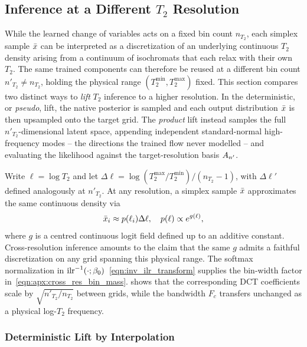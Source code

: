 \subsection{Inference at a Different \texorpdfstring{$T_2$}{T2} Resolution}\label{sec:apx:cross_resolution}

While the learned change of variables acts on a fixed bin count $n_{T_2}$, each simplex sample $\bar{x}$ can be interpreted as a discretization of an underlying continuous $T_2$ density arising from a continuum of isochromats that each relax with their own $T_2$.
The same trained components can therefore be reused at a different bin count $n'_{T_2} \neq n_{T_2}$, holding the physical range $(T_2^{\min}, T_2^{\max})$ fixed.
This section compares two distinct ways to \textit{lift} $T_2$ inference to a higher resolution.
In the deterministic, or \textit{pseudo}, lift, the native posterior is sampled and each output distribution $\bar{x}$ is then upsampled onto the target grid.
The \textit{product} lift instead samples the full $n'_{T_2}$-dimensional latent space, appending independent standard-normal high-frequency modes -- the directions the trained flow never modelled -- and evaluating the likelihood against the target-resolution basis $A_{n'}$.

Write $\ell = \log T_2$ and let $\Delta\ell = \log(T_2^{\max} / T_2^{\min}) / (n_{T_2} - 1)$, with $\Delta\ell'$ defined analogously at $n'_{T_2}$.
At any resolution, a simplex sample $\bar{x}$ approximates the same continuous density via
\begin{align}\label{eqn:apx:cross_res_bin_mass}
    \bar{x}_i \approx p(\ell_i) \Delta\ell, \quad p(\ell) \propto e^{g(\ell)},
\end{align}
where $g$ is a centred continuous logit field defined up to an additive constant.
Cross-resolution inference amounts to the claim that the same $g$ admits a faithful discretization on any grid spanning this physical range.
The softmax normalization in $\InvILR{\cdot; \beta_0}$~\eqref{eqn:inv_ilr_transform} supplies the bin-width factor in~\eqref{eqn:apx:cross_res_bin_mass}.
 shows that the corresponding \gls*{DCT} coefficients scale by $\sqrt{n'_{T_2} / n_{T_2}}$ between grids, while the bandwidth $F_c$ transfers unchanged as a physical log-$T_2$ frequency.

\subsubsection{Deterministic Lift by Interpolation}

